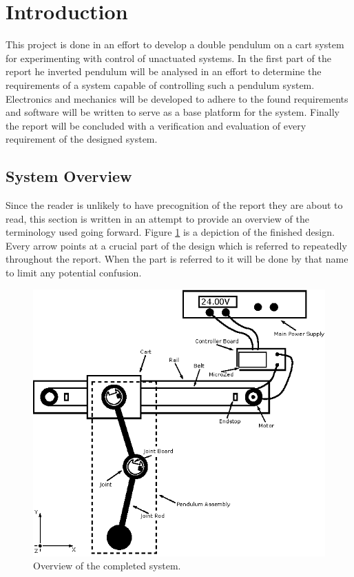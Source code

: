 \section{Introduction}
This project is done in an effort to develop a double pendulum on a cart system for experimenting with control of unactuated systems.
In the first part of the report he inverted pendulum will be analysed in an effort to determine the requirements of a system capable of controlling such a pendulum system.
Electronics and mechanics will be developed to adhere to the found requirements and software will be written to serve as a base platform for the system.
Finally the report will be concluded with a verification and evaluation of every requirement of the designed system.

\subsection{System Overview} %
\label{sub:system_overview}
Since the reader is unlikely to have precognition of the report they are about to read, this section is written in an attempt to provide an overview of the terminology used going forward.
Figure \ref{fig:systemoverview} is a depiction of the finished design.
Every arrow points at a crucial part of the design which is referred to repeatedly throughout the report.
When the part is referred to it will be done by that name to limit any potential confusion.
\begin{figure}[h]
	\centering
	\includegraphics[width=\linewidth]{graphics/system_overview}
	\caption{Overview of the completed system.}
	\label{fig:systemoverview}
\end{figure}

